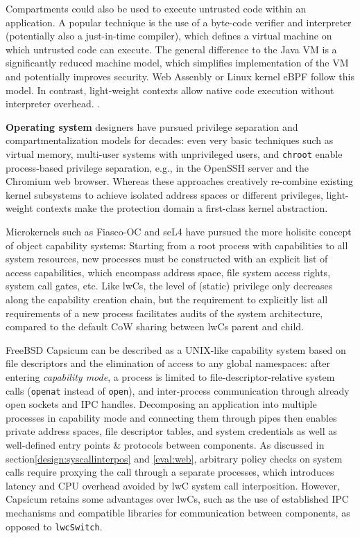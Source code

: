 \documentclass[10pt,twocolumn,letter]{article}
\begin{document}
Compartments could also be used to execute untrusted code within an application.
A popular technique is the use of a byte-code verifier and interpreter (potentially also a just-in-time compiler), which defines a virtual machine on which untrusted code can execute.
The general difference to the Java VM is a significantly reduced machine model, which simplifies implementation of the VM and potentially improves security.
Web Assenbly or Linux kernel eBPF follow this model.
In contrast, light-weight contexts allow native code execution without interpreter overhead.
\cite{haas2017bringingwebassembly, lwnebpf}.

\textbf{Operating system} designers have pursued privilege separation and compartmentalization models for decades:
even very basic techniques such as virtual memory, multi-user systems with unprivileged users, and \lstinline{chroot} enable process-based privilege separation, e.g., in the OpenSSH server and the Chromium web browser.
Whereas these approaches creatively re-combine existing kernel subsystems to achieve isolated address spaces or different privileges, light-weight contexts make the protection domain a first-class kernel abstraction.
\cite{provos2003preventing, barth2008security}

Microkernels such as Fiasco-OC and seL4 have pursued the more holisitc concept of object capability systems: 
Starting from a root process with capabilities to all system resources, new processes must be constructed with an explicit list of access capabilities, which encompass address space, file system access rights, system call gates, etc.
Like lwCs, the level of (static) privilege only decreases along the capability creation chain, but the requirement to explicitly list all requirements of a new process facilitates audits of the system architecture, compared to the default CoW sharing between lwCs parent and child.
\cite{elphinstone2013l3}

FreeBSD Capsicum can be described as a UNIX-like capability system based on file descriptors and the elimination of access to any global namespaces:
after entering \textit{capability mode}, a process is limited to file-descriptor-relative system calls (\lstinline{openat} instead of \lstinline{open}), and inter-process communication through already open sockets and IPC handles.
Decomposing an application into multiple processes in capability mode and connecting them through pipes then enables private address spaces, file descriptor tables, and system credentials as well as well-defined entry points \& protocols between components.
As discussed in section\ref{design:syscallinterpos} and \ref{eval:web}, arbitrary policy checks on system calls require proxying the call through a separate processes, which introduces latency and CPU overhead avoided by lwC system call interposition.
However, Capsicum retains some advantages over lwCs, such as the use of established IPC mechanisms and compatible libraries for communication between components, as opposed to \lstinline{lwcSwitch}.
\cite{watson2010capsicum}
\end{document}
